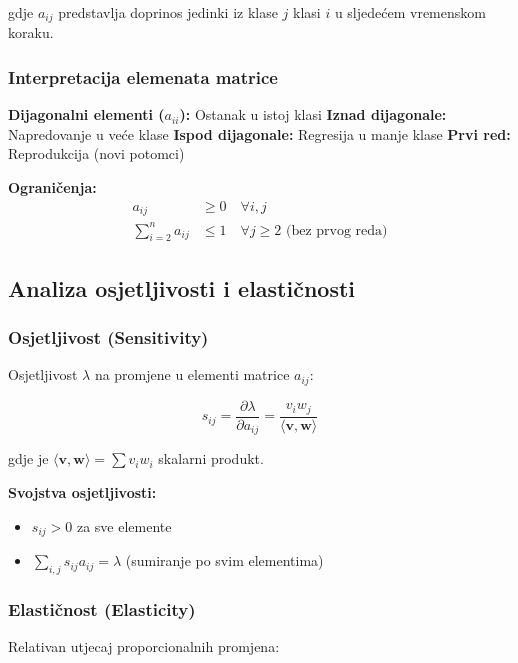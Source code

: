 \documentclass[11pt,oneside]{book}
\begin{document}
gdje $a_{ij}$ predstavlja doprinos jedinki iz klase $j$ klasi $i$ u sljedećem vremenskom koraku.

\subsubsection{Interpretacija elemenata matrice}

\textbf{Dijagonalni elementi ($a_{ii}$):} Ostanak u istoj klasi
\textbf{Iznad dijagonale:} Napredovanje u veće klase  
\textbf{Ispod dijagonale:} Regresija u manje klase
\textbf{Prvi red:} Reprodukcija (novi potomci)

\textbf{Ograničenja:}
\begin{align}
	a_{ij} &\geq 0 \quad \forall i,j \\
	\sum_{i=2}^{n} a_{ij} &\leq 1 \quad \forall j \geq 2 \text{ (bez prvog reda)}
\end{align}

\subsection{Analiza osjetljivosti i elastičnosti}

\subsubsection{Osjetljivost (Sensitivity)}

Osjetljivost $\lambda$ na promjene u elementi matrice $a_{ij}$:

\begin{equation}
	s_{ij} = \frac{\partial \lambda}{\partial a_{ij}} = \frac{v_i w_j}{\langle \mathbf{v}, \mathbf{w} \rangle}
\end{equation}

gdje je $\langle \mathbf{v}, \mathbf{w} \rangle = \sum v_i w_i$ skalarni produkt.

\textbf{Svojstva osjetljivosti:}
\begin{itemize}
	\item $s_{ij} > 0$ za sve elemente
	\item $\sum_{i,j} s_{ij} a_{ij} = \lambda$ (sumiranje po svim elementima)
\end{itemize}

\subsubsection{Elastičnost (Elasticity)}

Relativan utjecaj proporcionalnih promjena:
\end{document}

